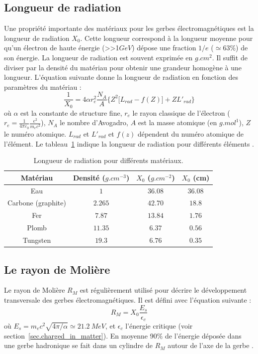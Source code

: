 \subsection{Longueur de radiation}
\label{sec.x0}
Une propriété importante des matériaux pour les gerbes électromagnétiques est la longueur de radiation $X_0$. Cette longueur correspond à la longueur moyenne pour qu'un électron de haute énergie (>>1$GeV$) dépose une fraction $1/e$ ($\simeq 63\%$) de son énergie. La longueur de radiation est souvent exprimée en $g.cm^2$. Il suffit de diviser par la densité du matériau pour obtenir une grandeur homogène à une longueur. L'équation suivante donne la longueur de radiation en fonction des paramètres du matériau \cite{pdg}: 
\begin{equation}
  \frac{1}{X_0}=4\alpha r_e^2\frac{N_A}{A}\big\{Z^2\big[L_{rad}-f(Z)\big]+ZL'_{rad}\big\}
  \label{eq.x0}
\end{equation}
où $\alpha$ est la constante de structure fine, $r_e$ le rayon classique de l'électron ($r_e=\frac{1}{4\pi\varepsilon_0}\frac{e^2}{m_ec^2}$), $N_A$ le nombre d'Avogadro, $A$ est la masse atomique (en $g.mol^1$), $Z$ le numéro atomique. $L_{rad}$ et $L'_{rad}$ et $f(z)$ dépendent du numéro atomique de l'élément. Le tableau~\ref{tab.x0} indique la longueur de radiation pour différents éléments \cite{pdg}.
\begin{table}[!ht]
  \begin{center}
    \begin{tabular}{c|c|c|c}
      Matériau & Densité ($g.cm^{-3}$) & $X_0$ ($g.cm^{-2}$) & $X_0$ (cm)\\
      \hline
      Eau & $1$ & $36.08$ & $36.08$ \\
      Carbone (graphite) & $2.265$ & $42.70$ & $18.8$\\
      Fer & $7.87$ & $13.84$ & $1.76$\\
      Plomb & $11.35$ & $6.37$ & $0.56$\\
      Tungsten & $19.3$ & $6.76$ & $0.35$
    \end{tabular}
  \end{center}  
  \caption{Longueur de radiation pour différents matériaux.}
  \label{tab.x0}
\end{table}

\subsection{Le rayon de Molière}
Le rayon de Molière $R_M$ est régulièrement utilisé pour décrire le développement transversale des gerbes électromagnétiques. Il est défini avec l'équation suivante \cite{pdg}:
\begin{equation}
  R_M=X_0\frac{E_s}{\epsilon_c}
\end{equation}
où $E_s=m_ec^2\sqrt{4\pi/\alpha}\simeq 21.2~MeV$, et $\epsilon_c$ l'énergie critique (voir section~\ref{sec.charged_in_matter}). En moyenne 90$\%$ de l'énergie déposée dans une gerbe hadronique se fait dans un cylindre de $R_M$ autour de l'axe de la gerbe \cite{wigmans}.

